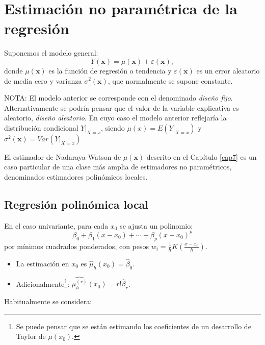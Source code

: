 \documentclass[
]{book}
\theoremstyle{definition}
\theoremstyle{definition}
\theoremstyle{definition}
\theoremstyle{remark}
\begin{document}
\hypertarget{estimaciuxf3n-no-paramuxe9trica-de-la-regresiuxf3n}{%
\section{Estimación no paramétrica de la regresión}\label{estimaciuxf3n-no-paramuxe9trica-de-la-regresiuxf3n}}

Suponemos el modelo general:
\[Y(\mathbf{x})=\mu(\mathbf{x})+\varepsilon(\mathbf{x}),\]
donde \(\mu(\mathbf{x})\) es la función de regresión o tendencia y
\(\varepsilon(\mathbf{x})\) es un error aleatorio de media cero y varianza
\(\sigma^2(\mathbf{x})\), que normalmente se supone constante.

NOTA: El modelo anterior se corresponde con el denominado \emph{diseño fijo}.
Alternativamente se podría pensar que el valor de la variable explicativa
es aleatorio, \emph{diseño aleatorio}.
En cuyo caso el modelo anterior reflejaría la distribución condicional
\(\left. Y\right\vert_{X=x}\), siendo \(\mu(x) = E\left( \left. Y\right\vert_{X=x} \right)\)
y \(\sigma^2(\mathbf{x}) = Var\left( \left. Y\right\vert_{X=x} \right)\)

El estimador de Nadaraya-Watson de \(\mu(\mathbf{x})\) descrito en el Capítulo \ref{cap7}
es un caso particular de una clase más amplia de estimadores no paramétricos,
denominados estimadores polinómicos locales.

\hypertarget{regresiuxf3n-polinuxf3mica-local}{%
\subsection{Regresión polinómica local}\label{regresiuxf3n-polinuxf3mica-local}}

En el caso univariante, para cada \(x_0\) se ajusta un polinomio:
\[\beta_0+\beta_{1}\left(x - x_0\right) + \cdots 
+ \beta_{p}\left( x-x_0\right)^{p}\]
por mínimos cuadrados ponderados, con pesos
\(w_{i} = \frac{1}{h}K\left(\frac{x-x_0}{h}\right)\).

\begin{itemize}
\item
  La estimación en \(x_0\) es \(\hat{\mu}_{h}(x_0)=\hat{\beta}_0\).
\item
  Adicionalmente\footnote{Se puede pensar que se están estimando los coeficientes de
    un desarrollo de Taylor de \(\mu(x_0)\).}:
  \(\widehat{\mu_{h}^{(r)}}(x_0) = r!\hat{\beta}_{r}\).
\end{itemize}

Habitualmente se considera:
\end{document}
